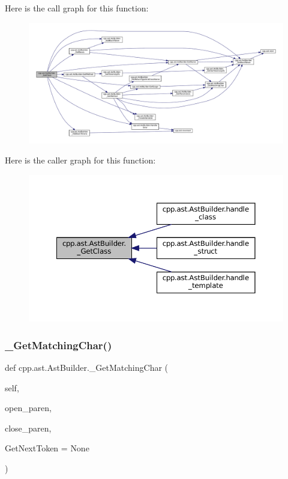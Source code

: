 Here is the call graph for this function\+:
\nopagebreak
\begin{figure}[H]
\begin{center}
\leavevmode
\includegraphics[width=350pt]{classcpp_1_1ast_1_1AstBuilder_af5670e1181b5af00bce0acc0dd9d0da7_cgraph}
\end{center}
\end{figure}
Here is the caller graph for this function\+:
\nopagebreak
\begin{figure}[H]
\begin{center}
\leavevmode
\includegraphics[width=350pt]{classcpp_1_1ast_1_1AstBuilder_af5670e1181b5af00bce0acc0dd9d0da7_icgraph}
\end{center}
\end{figure}
\mbox{\label{classcpp_1_1ast_1_1AstBuilder_a30936331903fe395451f8ed8ea2c26ba}} 
\subsubsection{\texorpdfstring{\+\_\+\+Get\+Matching\+Char()}{\_GetMatchingChar()}}
{\footnotesize\ttfamily def cpp.\+ast.\+Ast\+Builder.\+\_\+\+Get\+Matching\+Char (\begin{DoxyParamCaption}\item[{}]{self,  }\item[{}]{open\+\_\+paren,  }\item[{}]{close\+\_\+paren,  }\item[{}]{Get\+Next\+Token = {\ttfamily None} }\end{DoxyParamCaption})\hspace{0.3cm}{\ttfamily [private]}}



